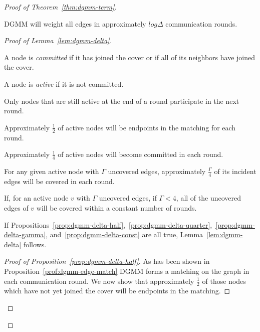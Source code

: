 \begin{proof}[Proof of Theorem~\ref{thm:dgmm-term}]
\begin{lem}
  \label{lem:dgmm-delta}
  DGMM will weight all edges in approximately $log\Delta$ communication rounds.
\end{lem}
\begin{proof}[Proof of Lemma~\ref{lem:dgmm-delta}]
\begin{ldef}
A node is {\em committed} if it has joined the cover or if all of its neighbors have joined the cover.
\end{ldef}
\begin{ldef}
A node is {\em active} if it is not committed.
\end{ldef}
\begin{note}
Only nodes that are still active at the end of a round participate in the next round. 
\end{note}
\begin{lprp}
\label{prop:dgmm-delta-half}
Approximately $\frac{1}{2}$ of active nodes will be endpoints in the matching for each round.
\end{lprp}

\begin{lprp}
\label{prop:dgmm-delta-quarter}
Approximately $\frac{1}{4}$ of active nodes will become committed in each round.
\end{lprp}
\begin{lprp}
\label{prop:dgmm-delta-gamma}
For any given active node with $\Gamma$ uncovered edges, approximately $\frac{\Gamma}{4}$ of its incident edges will be covered in each round.
\end{lprp}
\begin{lprp}
\label{prop:dgmm-delta-const}
If, for an active node $v$ with $\Gamma$ uncovered edges, if $\Gamma < 4$, all of the uncovered edges of $v$ will be covered within a constant number of rounds.
\end{lprp}

If Propositions~\ref{prop:dgmm-delta-half},~\ref{prop:dgmm-delta-quarter},~\ref{prop:dgmm-delta-gamma}, and~\ref{prop:dgmm-delta-const} are all true, Lemma~\ref{lem:dgmm-delta} follows.

\begin{proof}[Proof of Proposition~\ref{prop:dgmm-delta-half}]
 
As has been shown in Proposition~\ref{prof:dgmm-edge-match} DGMM forms a matching on the graph in each communication round. We now show that approximately $\frac{1}{2}$ of those nodes which have not yet joined the cover will be endpoints in the matching.


\end{proof}
\end{proof}
\end{proof}
